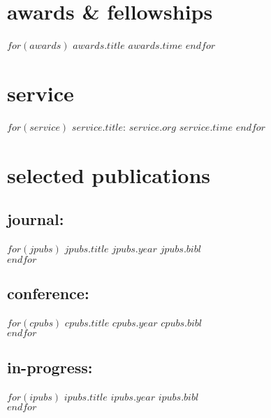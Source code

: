 \documentclass[]{friggeri-cv}
\begin{document}
\section{awards \& fellowships}
\begin{itemize}[noitemsep, leftmargin=0.55in]
$for(awards)$
  \entryitem
  {$awards.title$}
  {$awards.time$}
$endfor$
\end{itemize}



\vspace{-0.05in}
\section{service}
\begin{itemize}[noitemsep, leftmargin=0.55in]
$for(service)$
  \entryitem
  {$service.title$: $service.org$}
  {$service.time$}
$endfor$
\end{itemize}



\section{selected publications}

\vspace{-0.05in}
\subsection{journal:}
\begin{entrylist}
$for(jpubs)$
  \entrypub
  {$jpubs.title$}
  {$jpubs.year$}
  {$jpubs.bibl$}\\
$endfor$
\end{entrylist}

\vspace{-0.15in}
\subsection{conference:}
\begin{entrylist}
$for(cpubs)$
  \entrypub
  {$cpubs.title$}
  {$cpubs.year$}
  {$cpubs.bibl$}\\
$endfor$
\end{entrylist}

\vspace{-0.15in}
\subsection{in-progress:}
\begin{entrylist}
$for(ipubs)$
  \entrypub
  {$ipubs.title$}
  {$ipubs.year$}
  {$ipubs.bibl$}\\
$endfor$
\end{entrylist}



\end{document}

